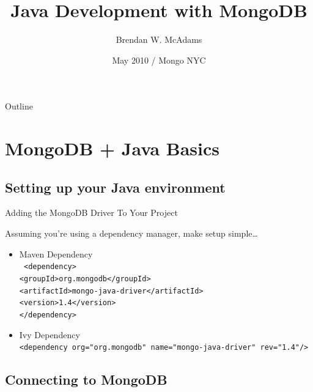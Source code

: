 \documentclass{beamer}
\title[Java Development with MongoDB] %
{Java Development with MongoDB}
\author[Brendan W. McAdams] 
{Brendan W. McAdams\\
}
\institute[Novus Partners, Inc.] %
{ Novus Partners, Inc.\\
  http://novus.com }
\date[Mongo NYC, May 2010] %
{May 2010 / Mongo NYC}
\begin{document}
\begin{frame}
  \titlepage
\end{frame}

\begin{frame}{Outline}
  \tableofcontents
\end{frame}




\section{MongoDB + Java Basics}

\subsection[Getting Started]{Setting up your Java environment}

\begin{frame}{Adding the MongoDB Driver To Your Project}
 
  Assuming you're using a dependency manager, make setup simple\dots
  \begin{itemize}
    \pause
  \item
       Maven Dependency\\
      \texttt{\scriptsize
       <dependency>\\
        <groupId>org.mongodb</groupId>\\
        <artifactId>mongo-java-driver</artifactId>\\
        <version>1.4</version>\\
      </dependency>}
  \item
      Ivy Dependency\\
      \texttt{\scriptsize <dependency org="org.mongodb" name="mongo-java-driver" rev="1.4"/>}
  \end{itemize}
\end{frame}

\subsection[Connecting to MongoDB]{Connecting to MongoDB}
\end{document}
